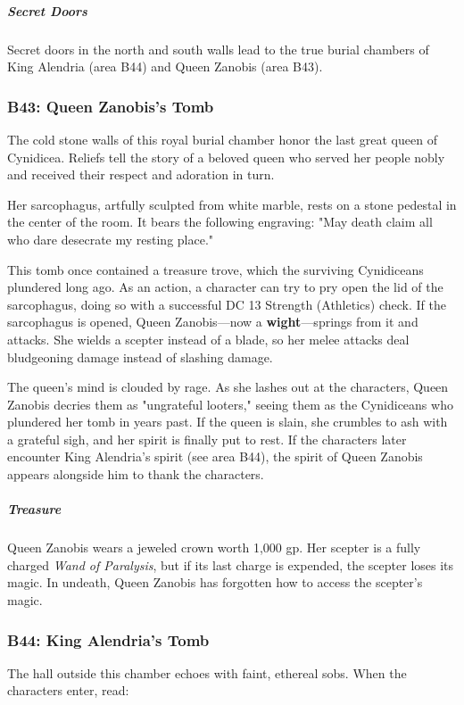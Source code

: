 \documentclass[10pt,a4paper,twoside,bg=print,twocolumn,openany,nodeprecatedcode]{dndbook}
\begin{document}
\subparagraph{Secret Doors}
Secret doors in the north and south walls lead to the true burial chambers of King Alendria (area B44) and Queen Zanobis (area B43).

\subsubsection{B43: Queen Zanobis's Tomb}
\begin{DndReadAloud}{}
The cold stone walls of this royal burial chamber honor the last great queen of Cynidicea. Reliefs tell the story of a beloved queen who served her people nobly and received their respect and adoration in turn.

Her sarcophagus, artfully sculpted from white marble, rests on a stone pedestal in the center of the room. It bears the following engraving: "May death claim all who dare desecrate my resting place."

\end{DndReadAloud}

This tomb once contained a treasure trove, which the surviving Cynidiceans plundered long ago. As an action, a character can try to pry open the lid of the sarcophagus, doing so with a successful DC 13 Strength (Athletics) check. If the sarcophagus is opened, Queen Zanobis—now a \textbf{wight}—springs from it and attacks. She wields a scepter instead of a blade, so her melee attacks deal bludgeoning damage instead of slashing damage.

The queen's mind is clouded by rage. As she lashes out at the characters, Queen Zanobis decries them as "ungrateful looters," seeing them as the Cynidiceans who plundered her tomb in years past. If the queen is slain, she crumbles to ash with a grateful sigh, and her spirit is finally put to rest. If the characters later encounter King Alendria's spirit (see area B44), the spirit of Queen Zanobis appears alongside him to thank the characters.

\subparagraph{Treasure}
Queen Zanobis wears a jeweled crown worth 1,000 gp. Her scepter is a fully charged \textit{Wand of Paralysis}, but if its last charge is expended, the scepter loses its magic. In undeath, Queen Zanobis has forgotten how to access the scepter's magic.

\subsubsection{B44: King Alendria's Tomb}
The hall outside this chamber echoes with faint, ethereal sobs. When the characters enter, read:
\end{document}

